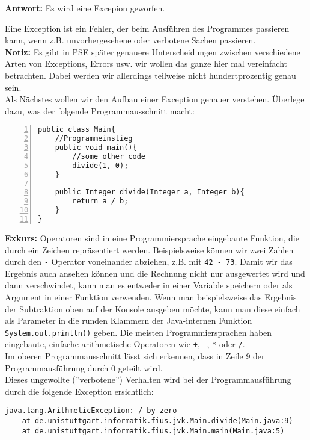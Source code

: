 \textbf{Antwort:} Es wird eine Excepion geworfen.\\
\begin{Infobox}[Exception]
    Eine Exception ist ein Fehler, der beim Ausführen des Programmes passieren kann, wenn z.B. unvorhergesehene oder verbotene Sachen passieren.\\

\textbf{Notiz:} Es gibt in PSE später genauere Unterscheidungen zwischen verschiedene Arten von Exceptions, Errors usw. wir wollen das ganze hier mal vereinfacht betrachten. Dabei werden wir allerdings teilweise nicht hundertprozentig genau sein.\\

Als Nächstes wollen wir den Aufbau einer Exception genauer verstehen.
Überlege dazu, was der folgende Programmausschnitt macht:

    \begin{lstlisting}[numbers=left,xleftmargin=2em,frame=single,framexleftmargin=1.5em]
public class Main{
    //Programmeinstieg
    public void main(){
        //some other code
        divide(1, 0);
    }
    
    public Integer divide(Integer a, Integer b){
        return a / b;
    }
}
    \end{lstlisting}
    \textbf{Exkurs:} Operatoren sind in eine Programmiersprache eingebaute Funktion, die durch ein Zeichen repräsentiert werden.
Beispielsweise können wir zwei Zahlen durch den \texttt{-} Operator voneinander abziehen, z.B. mit \texttt{42 - 73}.
Damit wir das Ergebnis auch ansehen können und die Rechnung nicht nur ausgewertet wird und dann verschwindet, kann man es entweder in einer Variable speichern oder als Argument in einer Funktion verwenden.
Wenn man beispielsweise das Ergebnis der Subtraktion oben auf der Konsole ausgeben möchte, kann man diese einfach als Parameter in die runden Klammern der Java-internen Funktion \lstinline{System.out.println()} geben.
Die meisten Programmiersprachen haben eingebaute, einfache arithmetische Operatoren wie \texttt{+}, \texttt{-}, \texttt{*} oder \texttt{/}.\\

Im oberen Programmausschnitt lässt sich erkennen, dass in Zeile 9 der Programmausführung durch 0 geteilt wird.\\
Dieses ungewollte (''verbotene'') Verhalten wird bei der Programmausführung durch die folgende Exception ersichtlich:
    \begin{lstlisting}[keywords={}, breaklines=true, numbers=none]
java.lang.ArithmeticException: / by zero
    at de.unistuttgart.informatik.fius.jvk.Main.divide(Main.java:9)
    at de.unistuttgart.informatik.fius.jvk.Main.main(Main.java:5)
    \end{lstlisting}    


\end{Infobox}
